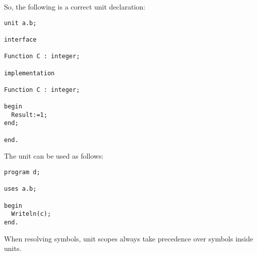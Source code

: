 So, the following is a correct unit declaration:
\begin{verbatim}
unit a.b;

interface

Function C : integer;

implementation

Function C : integer;

begin
  Result:=1;
end;

end.
\end{verbatim}
The unit can be used as follows:
\begin{verbatim}
program d;

uses a.b;

begin
  Writeln(c);
end.
\end{verbatim}
When resolving symbols, unit scopes always take precedence over symbols inside units.

